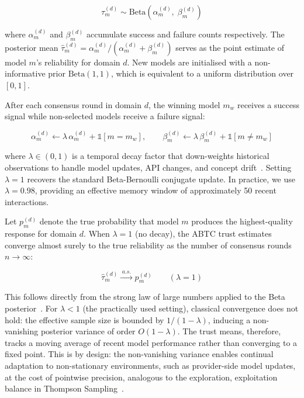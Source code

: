 \documentclass{iopjournal}
\begin{document}
\begin{equation}
\tau_m^{(d)} \sim \text{Beta}(\alpha_m^{(d)},\; \beta_m^{(d)})
\label{eq:trust_prior}
\end{equation}

\noindent where $\alpha_m^{(d)}$ and $\beta_m^{(d)}$ accumulate success and failure counts respectively. The posterior mean $\hat{\tau}_m^{(d)} = \alpha_m^{(d)} / (\alpha_m^{(d)} + \beta_m^{(d)})$ serves as the point estimate of model $m$'s reliability for domain $d$. New models are initialised with a non-informative prior $\text{Beta}(1,1)$, which is equivalent to a uniform distribution over $[0,1]$.

After each consensus round in domain $d$, the winning model $m_w$ receives a success signal while non-selected models receive a failure signal:

\begin{equation}
\alpha_{m}^{(d)} \leftarrow \lambda\,\alpha_{m}^{(d)} + \mathds{1}[m = m_w], \qquad
\beta_{m}^{(d)} \leftarrow \lambda\,\beta_{m}^{(d)} + \mathds{1}[m \neq m_w]
\label{eq:update}
\end{equation}

\noindent where $\lambda \in (0,1)$ is a temporal decay factor that down-weights historical observations to handle model updates, API changes, and concept drift~\cite{ThompsonSampling}. Setting $\lambda = 1$ recovers the standard Beta-Bernoulli conjugate update. In practice, we use $\lambda = 0.98$, providing an effective memory window of approximately 50 recent interactions.

Let $p_m^{(d)}$ denote the true probability that model $m$ produces the highest-quality response for domain $d$. When $\lambda = 1$ (no decay), the ABTC trust estimates converge almost surely to the true reliability as the number of consensus rounds $n \to \infty$:

\begin{equation}
\hat{\tau}_m^{(d)} \xrightarrow{\;a.s.\;} p_m^{(d)} \qquad (\lambda = 1)
\label{eq:convergence}
\end{equation}

\noindent This follows directly from the strong law of large numbers applied to the Beta posterior~\cite{BetaBernoulli}. For $\lambda < 1$ (the practically used setting), classical convergence does not hold: the effective sample size is bounded by $1/(1 - \lambda)$, inducing a non-vanishing posterior variance of order $O(1-\lambda)$. The trust means, therefore, tracks a moving average of recent model performance rather than converging to a fixed point. This is by design: the non-vanishing variance enables continual adaptation to non-stationary environments, such as provider-side model updates, at the cost of pointwise precision, analogous to the exploration, exploitation balance in Thompson Sampling~\cite{ThompsonSampling}.
\end{document}
